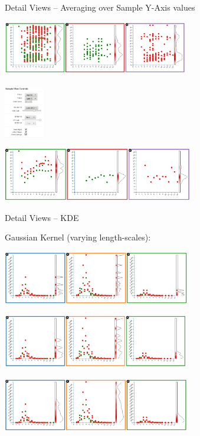 \documentclass{beamer}
\begin{document}
\begin{frame}{Detail Views -- Averaging over Sample Y-Axis values}

  \centerline{
  \includegraphics[height=2.35cm]{./img/fview_davg_pre.png}
  }

  \centerline{
  \includegraphics[height=2.35cm]{./img/fview_ctrls_davg.png}
  }

  \centerline{
  \includegraphics[height=2.35cm]{./img/fview_davg_post.png}
  }

\end{frame}

\begin{frame}{Detail Views -- KDE}

  \begin{block}{Gaussian Kernel (varying length-scales):}

  \centerline{
  \includegraphics[height=2.35cm]{./img/fview_kde_1.png}
  }

  \centerline{
  \includegraphics[height=2.35cm]{./img/fview_kde_2.png}
  }

  \centerline{
  \includegraphics[height=2.35cm]{./img/fview_kde_3.png}
  }

  \end{block}

\end{frame}
\end{document}
